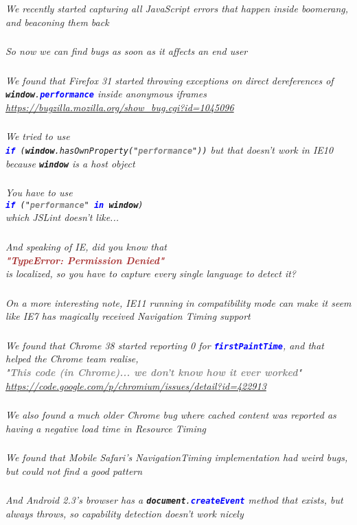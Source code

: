 \documentclass{beamer}
\newcommand{\innersplash}[1]{
  \begin{center}
    \large \textrm{\textit{ #1 } }
  \end{center}
}
\newcommand{\splashslide}[2][{}]{
  \begin{frame}
  \frametitle{#1}
  \innersplash{#2}
  \end{frame}
}
\def\gray<#1>#2{\textcolor<#1>{gray}{\textbf<#1>{#2}}}
\def\brown<#1>#2{\textcolor<#1>{brown}{\textbf<#1>{#2}}}
\def\green<#1>#2{\textcolor<#1>{dark-green}{\textbf<#1>{#2}}}
\def\blue<#1>#2{\textcolor<#1>{blue}{\textbf<#1>{#2}}}
\begin{document}
\splashslide{We recently started capturing all JavaScript errors that happen inside boomerang, and beaconing them back}

\splashslide{So now we can find bugs as soon as it affects an end user}

\splashslide{We found that Firefox 31 started throwing exceptions on direct dereferences of \texttt{\green<1>{window}.\blue<1>{performance}} inside anonymous iframes \\ \tiny \href{https://bugzilla.mozilla.org/show_bug.cgi?id=1045096}{https://bugzilla.mozilla.org/show\_bug.cgi?id=1045096}}

\splashslide{We tried to use \\ \texttt{\blue<1>{if} (\green<1>{window}.hasOwnProperty("\gray<1>{performance}"))} but that doesn't work in IE10 because \texttt{\green<1>{window}} is a host object}

\splashslide{You have to use \\ \texttt{\blue<1->{if} ("\gray<1->{performance}" \blue<1->{in} \green<1->{window})} \\ which JSLint doesn't like...\\ \only<2->{But no one likes JSLint so it's okay}}

\splashslide{And speaking of IE, did you know that \\ \brown<1>{"TypeError: Permission Denied"} \\ is localized, so you have to capture every single language to detect it?}

\splashslide{On a more interesting note, IE11 running in compatibility mode can make it seem like IE7 has magically received Navigation Timing support}

\splashslide{We found that Chrome 38 started reporting 0 for \texttt{\blue<1->{firstPaintTime}}, and that helped the Chrome team realise, \\ "\gray<1->{This code (in Chrome)... we don't know how it ever worked}" \\ \tiny \href{https://code.google.com/p/chromium/issues/detail?id=422913}{https://code.google.com/p/chromium/issues/detail?id=422913}}

\splashslide{We also found a much older Chrome bug where cached content was reported as having a negative load time in Resource Timing}

\splashslide{We found that Mobile Safari's NavigationTiming implementation had weird bugs, but could not find a good pattern}

\splashslide{And Android 2.3's browser has a \texttt{\green<1>{document}.\blue<1>{createEvent}} method that exists, but always throws, so capability detection doesn't work nicely}
\end{document}
